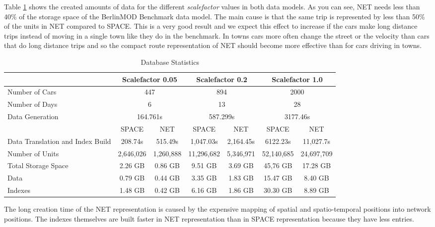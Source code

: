 \documentclass[a4paper]{article}
\newcommand{\bmodb} {BerlinMOD Benchmark}
\begin{document}
Table \ref{tab:dbstat} shows the created amounts of data for the different
\textit{scalefactor} values in both data models. As you can see, NET needs less
than 40\% of the storage space of the \bmodb{} data model. The main cause is
that the same trip is represented by less than 50\% of the units in NET
compared to SPACE. This is a very good result and we expect this effect to
increase if the cars make long distance trips instead of moving in a single town
like they do in the benchmark. In towns cars more often change the street or the 
velocity than cars that do long distance trips and so the compact route 
representation of NET should become more effective than for cars driving in towns.
\begin{table}[htbp]
\begin{center}
\begin{scriptsize}
\begin{tabularx}{1.0\textwidth}{|X|c|c|c|c|c|c|}
\hline
& \multicolumn{2}{c|}{\textbf{Scalefactor 0.05}} & \multicolumn{2}{c|}{\textbf{Scalefactor 0.2}} & \multicolumn{2}{c|}{\textbf{Scalefactor 1.0}}\\
\hline
Number of Cars                   & \multicolumn{2}{c|}{447}      & \multicolumn{2}{c|}{894}      & \multicolumn{2}{c|}{2000}
\\
\hline
Number of Days                   & \multicolumn{2}{c|}{6}        & \multicolumn{2}{c|}{13}       & \multicolumn{2}{c|}{28}\\
\hline
Data Generation                  & \multicolumn{2}{c|}{164.761s} & \multicolumn{2}{c|}{587.299s} & \multicolumn{2}{c|}{3177.46s}\\
\hline
                                 & SPACE     & NET               & SPACE      & NET              & SPACE      & NET\\
\hline
Data Translation and Index Build & 208.74s   & 515.49s           & 1,047.03s  & 2,164.45s        & 6122.23s   & 11,027.7s\\
\hline
Number of Units                  & 2,646,026 & 1,260,888         & 11,296,682 & 5,346,971        & 52,140,685 & 24,697,709\\
\hline
Total Storage Space              & 2.26 GB   & 0.86 GB           & 9.51 GB    & 3.69 GB          & 45,76 GB   & 17.28 GB\\
Data                             & 0.79 GB   & 0.44 GB           & 3.35 GB    & 1.83 GB          & 15.47 GB   &  8.40 GB\\
Indexes                          & 1.48 GB   & 0.42 GB           & 6.16 GB    & 1.86 GB          &30.30 GB    &  8.89 GB\\
\hline
\end{tabularx}
\end{scriptsize}
\caption{Database Statistics}
\label{tab:dbstat}
\end{center}
\end{table}
The long creation time of the NET representation is
caused by the expensive mapping of spatial and spatio-temporal positions into
network positions. The indexes themselves are built faster in NET representation
than in SPACE representation because they have less entries.
\end{document}

